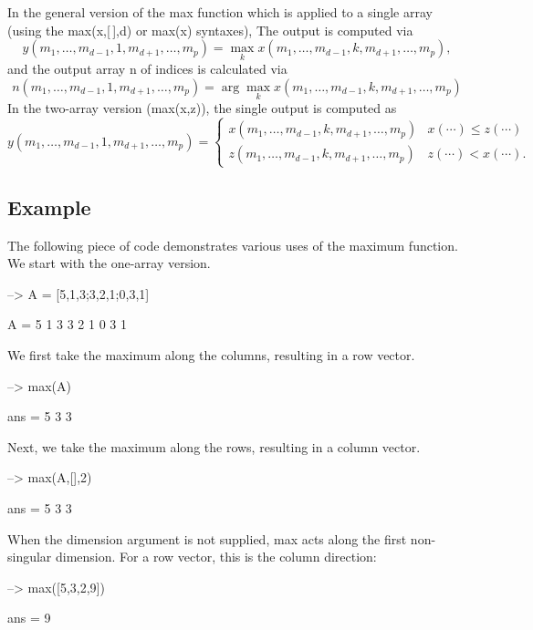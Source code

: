 In the general version of the {\ttfamily max} function which is applied to a single array (using the {\ttfamily max(x,\mbox{[}$\,$\mbox{]},d)} or {\ttfamily max(x)} syntaxes), The output is computed via \[ y(m_1,\ldots,m_{d-1},1,m_{d+1},\ldots,m_{p}) = \max_{k} x(m_1,\ldots,m_{d-1},k,m_{d+1},\ldots,m_{p}), \] and the output array {\ttfamily n} of indices is calculated via \[ n(m_1,\ldots,m_{d-1},1,m_{d+1},\ldots,m_{p}) = \arg \max_{k} x(m_1,\ldots,m_{d-1},k,m_{d+1},\ldots,m_{p}) \] In the two-\/array version ({\ttfamily max(x,z)}), the single output is computed as \[ y(m_1,\ldots,m_{d-1},1,m_{d+1},\ldots,m_{p}) = \begin{cases} x(m_1,\ldots,m_{d-1},k,m_{d+1},\ldots,m_{p}) & x(\cdots) \leq z(\cdots) \\ z(m_1,\ldots,m_{d-1},k,m_{d+1},\ldots,m_{p}) & z(\cdots) < x(\cdots). \end{cases} \] \hypertarget{variables_struct_Example}{}\subsection{Example}\label{variables_struct_Example}
The following piece of code demonstrates various uses of the maximum function. We start with the one-\/array version.


\begin{DoxyVerbInclude}
--> A = [5,1,3;3,2,1;0,3,1]

A = 
 5 1 3 
 3 2 1 
 0 3 1 
\end{DoxyVerbInclude}


We first take the maximum along the columns, resulting in a row vector.


\begin{DoxyVerbInclude}
--> max(A)

ans = 
 5 3 3 
\end{DoxyVerbInclude}


Next, we take the maximum along the rows, resulting in a column vector.


\begin{DoxyVerbInclude}
--> max(A,[],2)

ans = 
 5 
 3 
 3 
\end{DoxyVerbInclude}


When the dimension argument is not supplied, {\ttfamily max} acts along the first non-\/singular dimension. For a row vector, this is the column direction\-:


\begin{DoxyVerbInclude}
--> max([5,3,2,9])

ans = 
 9 
\end{DoxyVerbInclude}


